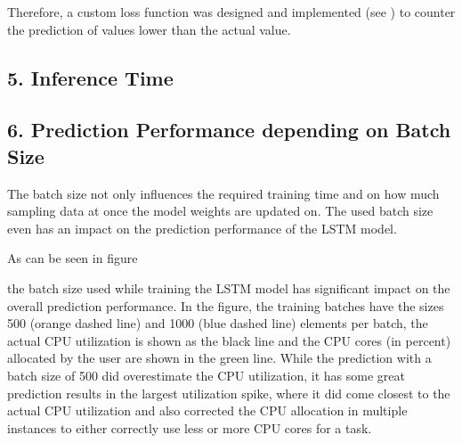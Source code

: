       Therefore, a custom loss function was designed and implemented (see ) to counter the prediction of values lower than the actual value.

  \subsection{5. Inference Time}
  \label{sec:inference-time-evaluation-scenarios}


  \subsection{6. Prediction Performance depending on Batch Size}
  \label{sec:prediction-performance-depending-on-batch-size-evaluation-scenarios}




  The batch size not only influences the required training time and  on how much sampling data at once the model weights are updated on. The used batch size even has an impact on the prediction performance of the LSTM model.
    
  As can be seen in figure 
  
  the batch size used while training the LSTM model has significant impact on the overall prediction performance.
  In the figure, the training batches have the sizes 500 (orange dashed line) and 1000 (blue dashed line) elements per batch, the actual CPU utilization is shown as the black line and the CPU cores (in percent) allocated by the user are shown in the green line. While the prediction with a batch size of 500 did overestimate the CPU utilization, it has some great prediction results in the largest utilization spike, where it did come closest to the actual CPU utilization and also corrected the CPU allocation in multiple instances to either correctly use less or more CPU cores for a task.
  
  
  


